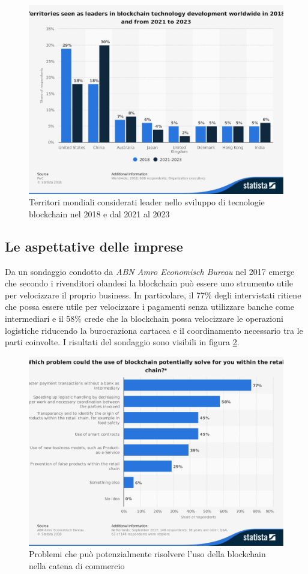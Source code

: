 \begin{figure}[H]
	\centering
	\includegraphics[width=.75\linewidth]{images/chap_intro/leading-territories-worldwide.pdf}
	\caption{Territori mondiali considerati leader nello sviluppo di tecnologie blockchain
		nel 2018 e dal 2021 al 2023
		\cite{leading-territories-worldwide}}
	\label{fig:leading-territories-worldwide}
\end{figure}

\subsection{Le aspettative delle imprese}

Da un sondaggio condotto da \textit{ABN Amro Economisch Bureau} nel 2017 \cite{potential-blockchain-applications}
emerge che secondo i rivenditori olandesi la blockchain può essere uno strumento
utile per velocizzare il proprio business. In particolare,
il 77\% degli intervistati ritiene che possa essere utile per velocizzare
i pagamenti senza utilizzare banche come intermediari e il 58\% crede che
la blockchain possa velocizzare le operazioni logistiche riducendo la burocraziona cartacea
e il coordinamento necessario tra le parti coinvolte.
I risultati del sondaggio sono visibili in figura \ref{fig:potential-blockchain-applications}.
\begin{figure}[H]
	\centering
	\includegraphics[width=.75\linewidth]{images/chap_intro/potential-blockchain-applications.pdf}
	\caption{Problemi che può potenzialmente risolvere l'uso della blockchain
		nella catena di commercio \cite{potential-blockchain-applications}}
	\label{fig:potential-blockchain-applications}
\end{figure}


